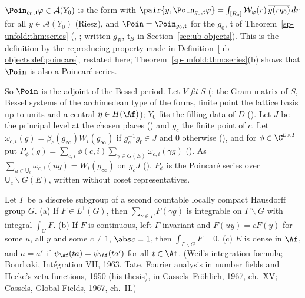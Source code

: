 \begin{definition}
\label{sp-unfold:def:poincare}
$\Poin_{g_0,\mathfrak t}\varphi\in\mathcal A(Y_0)$ is the form with $\pair{y,\Poin_{g_0,\mathfrak t}\varphi}=\int_{[R_0]}
\mathcal W_\varphi(r)\,\overline{y(rg_0)}\,dr$ for all $y\in\mathcal A(Y_0)$ (Riesz), and
$\Poin=\Poin_{g_0,\mathfrak t}$ for the $g_0$, $\mathfrak t$ of Theorem~\ref{sp-unfold:thm:series}
(, ; written $g_B$, $\mathfrak t_B$ in
Section~\ref{sec:ub-objects}). This is the definition by the reproducing property made in
Definition~\ref{ub-objects:def:poincare}, restated here; Theorem~\ref{sp-unfold:thm:series}(b)
shows that $\Poin$ is also a Poincar\'e series.
\end{definition}

So $\Poin$ is the adjoint of the Bessel period. Let $V$
\emph{fit} $S$ (: the Gram matrix of $S$, Bessel systems of the archimedean
type of the forms, finite point the lattice basis up to units and a central $\eta\in H(\Af)$); $Y_0$
fits the filling data of $D$ (). Let $J$ be the principal level at the
chosen places () and $g_c$ the finite point of $c$. Let
$\omega_{c,i}(g)=\beta_c(g_\infty)W_i(g_\infty)$ if $g_c^{-1}g_{\mathrm f}\in J$ and $0$ otherwise
(), and for $\phi\in\C^{\mathcal C\times I}$ put
$P_\phi(g)=\sum_{c,i}\phi(c,i)\sum_{\gamma\in G(E)}\omega_{c,i}(\gamma g)$
(). As $\sum_{u\in\mathsf U_c}\omega_{c,i}(ug)=W_i(g_\infty)$ on
$g_cJ$ (), $P_\phi$ is the Poincaré series
over $\mathsf U_c\backslash G(E)$, written without coset representatives.

\begin{fact}\label{sp-unfold:fact:unfold}
Let $\Gamma$ be a discrete subgroup of a second countable locally compact Hausdorff group $G$. (a)
If $F\in L^1(G)$, then $\sum_{\gamma\in\Gamma}F(\gamma g)$ is integrable on $\Gamma\backslash G$ with integral
$\int_GF$. (b) If $F$ is continuous, left $\Gamma$-invariant and $F(uy)=cF(y)$ for some $u$, all $y$
and some $c\ne1$, $\abs c=1$, then $\int_{\Gamma\backslash G}F=0$. (c) $E$ is dense in $\Af$, and
$a=a'$ if $\psi_{\Af}(ta)=\psi_{\Af}(ta')$ for all $t\in\Af$. (Weil's integration formula; Bourbaki,
Intégration VII, 1963. Tate, Fourier analysis in number fields and Hecke's zeta-functions, 1950
(his thesis), in Cassels--Fröhlich, 1967, ch.~XV; Cassels, Global Fields, 1967, ch.~II.)
\end{fact}

